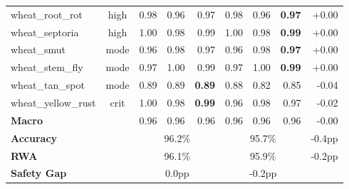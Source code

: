 \begin{table}[t]
{\begin{tabular}{l c | r r r | r r r | r}
  wheat\_root\_rot & high & 0.98 & 0.96 & 0.97 & 0.98 & 0.96 & \textbf{0.97} & +0.00 \\
  wheat\_septoria & high & 1.00 & 0.98 & 0.99 & 1.00 & 0.98 & \textbf{0.99} & +0.00 \\
  wheat\_smut & mode & 0.96 & 0.98 & 0.97 & 0.96 & 0.98 & \textbf{0.97} & +0.00 \\
  wheat\_stem\_fly & mode & 0.97 & 1.00 & 0.99 & 0.97 & 1.00 & \textbf{0.99} & +0.00 \\
  wheat\_tan\_spot & mode & 0.89 & 0.89 & \textbf{0.89} & 0.88 & 0.82 & 0.85 & -0.04 \\
  wheat\_yellow\_rust & crit & 1.00 & 0.98 & \textbf{0.99} & 0.96 & 0.98 & 0.97 & -0.02 \\
\midrule
  \textbf{Macro} & & 0.96 & 0.96 & 0.96 & 0.96 & 0.96 & 0.96 & -0.00 \\
\midrule
  \textbf{Accuracy} & & \multicolumn{3}{c|}{96.2\%} & \multicolumn{3}{c|}{95.7\%} & -0.4pp \\
  \textbf{RWA} & & \multicolumn{3}{c|}{96.1\%} & \multicolumn{3}{c|}{95.9\%} & -0.2pp \\
  \textbf{Safety Gap} & & \multicolumn{3}{c|}{0.0pp} & \multicolumn{3}{c|}{-0.2pp} & \\
\bottomrule
\end{tabular}}
\end{table}